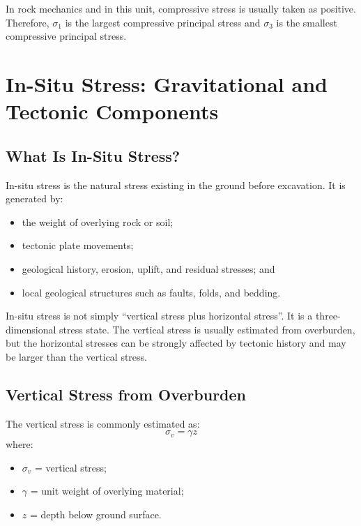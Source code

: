\documentclass[a4paper,12pt]{article}
\begin{document}
\begin{keybox}
In rock mechanics and in this unit, compressive stress is usually taken as positive.
Therefore, \(\sigma_1\) is the largest compressive principal stress and \(\sigma_3\) is the
smallest compressive principal stress.
\end{keybox}

\section{In-Situ Stress: Gravitational and Tectonic Components}

\subsection{What Is In-Situ Stress?}

In-situ stress is the natural stress existing in the ground before excavation. It is generated
by:
\begin{itemize}
    \item the weight of overlying rock or soil;
    \item tectonic plate movements;
    \item geological history, erosion, uplift, and residual stresses; and
    \item local geological structures such as faults, folds, and bedding.
\end{itemize}

\begin{warnbox}
In-situ stress is not simply ``vertical stress plus horizontal stress''. It is a
three-dimensional stress state. The vertical stress is usually estimated from overburden,
but the horizontal stresses can be strongly affected by tectonic history and may be larger
than the vertical stress.
\end{warnbox}

\subsection{Vertical Stress from Overburden}

The vertical stress is commonly estimated as:
\[
\sigma_v = \gamma z
\]
where:
\begin{itemize}
    \item \(\sigma_v\) = vertical stress;
    \item \(\gamma\) = unit weight of overlying material;
    \item \(z\) = depth below ground surface.
\end{itemize}
\end{document}
